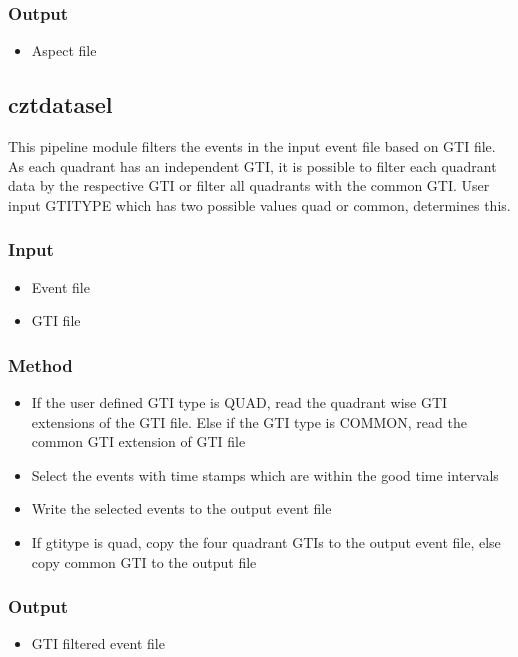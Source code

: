 \documentclass[11pt,oneside,a4paper]{article}
\begin{document}
\subsubsection*{Output}
\begin{itemize}
    \item{Aspect file}
\end{itemize}


\subsection{cztdatasel}
This pipeline module filters the events in the input event file based 
on GTI file. As each quadrant has an independent GTI, it is possible to 
filter each quadrant data by the respective GTI or filter all quadrants 
with the common GTI. User input GTITYPE which has two possible values 
quad or common, determines this.

\subsubsection*{Input}
\renewcommand\labelitemi{{\boldmath$\cdot$}}
\begin{itemize}
\item{Event file}
\item{GTI file}
\end{itemize}
\subsubsection*{Method}
\begin{itemize}
    \item{If the user defined GTI type is QUAD, read the quadrant wise GTI extensions of the GTI file. Else 
        if the GTI type is COMMON, read the common GTI extension of GTI file}
    \item{Select the events with time stamps which are within the good time intervals}
    \item{Write the selected events to the output event file}
    \item{If gtitype is quad, copy the four quadrant GTIs to the output event file, else copy 
        common GTI to the output file}    
\end{itemize}
\subsubsection*{Output}
\begin{itemize}
    \item{GTI filtered event file}
\end{itemize}
\end{document}
